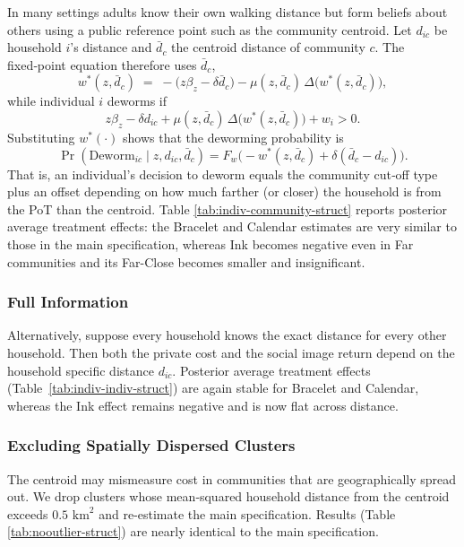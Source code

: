 \documentclass[12pt,a4paper]{article}
\begin{document}
In many settings adults know their own walking distance but form beliefs about others using a public reference point such as the community centroid. Let \(d_{ic}\) be household \(i\)’s distance and \(\bar d_{c}\) the centroid distance of community \(c\). The fixed‑point equation therefore uses \(\bar d_{c}\),
\[
  w^{\ast}(z,\bar d_{c})
  \;=\;
  -\!\bigl(z\beta_{z}-\delta \bar d_{c}\bigr)
  -\mu(z,\bar d_{c})\,
   \Delta\!\bigl(w^{\ast}(z,\bar d_{c})\bigr),
\]
while individual \(i\) deworms if
\[
  z\beta_{z}-\delta d_{ic}
  +\mu(z,\bar d_{c})\,
   \Delta\!\bigl(w^{\ast}(z,\bar d_{c})\bigr)
  +w_{i}
  >0.
\]
Substituting \(w^{\ast}(\cdot)\) shows that the deworming probability is
\[
  \Pr(\text{Deworm}_{ic}\mid z,d_{ic},\bar d_{c})
  =F_{w}\!\bigl(-w^{\ast}(z,\bar d_{c})+\delta(\bar d_{c}-d_{ic})\bigr).
\]
That is, an individual’s decision to deworm equals the community cut‑off type plus an offset depending on how much farther (or closer) the household is from the PoT than the centroid. Table \ref{tab:indiv-community-struct} reports posterior average treatment effects: the Bracelet and Calendar estimates are very similar to those in the main specification, whereas Ink becomes negative even in Far communities and its Far-Close becomes smaller and insignificant. 

\subsubsection{Full Information}\label{sec:private-cost-full-info}

Alternatively, suppose every household knows the exact distance for every other household.  Then both the private cost and the social image return depend on the household specific distance \(d_{ic}\).  Posterior average treatment effects (Table~\ref{tab:indiv-indiv-struct}) are again stable for Bracelet and Calendar, whereas the Ink effect remains negative and is now flat across distance. %


\subsubsection{Excluding Spatially Dispersed Clusters}\label{sec:no-outliers}

The centroid may mismeasure cost in communities that are geographically spread out. We drop clusters whose mean‑squared household distance from the centroid exceeds \(0.5\text{ km}^{2}\) and re-estimate the main specification. Results (Table \ref{tab:nooutlier-struct}) are nearly identical to the main specification.
\end{document}
